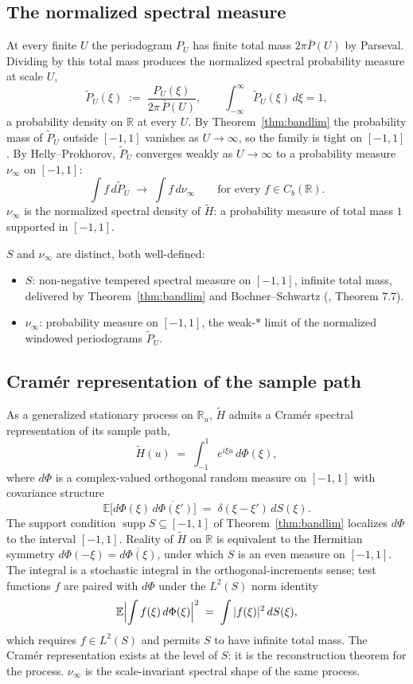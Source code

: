 \documentclass[11pt]{article}
\DeclareMathOperator{\supp}{supp}
\begin{document}
\subsection{The normalized spectral measure}\label{app:normalized}

At every finite $U$ the periodogram $P_U$ has finite total mass $2\pi\bar P(U)$ by Parseval. Dividing by this total mass produces the normalized spectral probability measure at scale $U$,
\[
\widetilde P_U(\xi) \;:=\; \frac{P_U(\xi)}{2\pi\,\bar P(U)},\qquad \int_{-\infty}^{\infty}\widetilde P_U(\xi)\,d\xi = 1,
\]
a probability density on $\mathbb{R}$ at every $U$. By Theorem~\ref{thm:bandlim} the probability mass of $\widetilde P_U$ outside $[-1,1]$ vanishes as $U\to\infty$, so the family is tight on $[-1,1]$. By Helly--Prokhorov, $\widetilde P_U$ converges weakly as $U\to\infty$ to a probability measure $\nu_\infty$ on $[-1,1]$:
\[
\int f\,d\widetilde P_U \;\longrightarrow\; \int f\,d\nu_\infty\qquad \text{for every } f\in C_b(\mathbb{R}).
\]
$\nu_\infty$ is the normalized spectral density of $\tilde H$: a probability measure of total mass $1$ supported in $[-1,1]$.

$S$ and $\nu_\infty$ are distinct, both well-defined:
\begin{itemize}[leftmargin=*]
\item $S$: non-negative tempered spectral measure on $[-1,1]$, infinite total mass, delivered by Theorem~\ref{thm:bandlim} and Bochner--Schwartz (\cite{Rudin-FA}, Theorem 7.7).
\item $\nu_\infty$: probability measure on $[-1,1]$, the weak-$*$ limit of the normalized windowed periodograms $\widetilde P_U$.
\end{itemize}

\subsection{Cram\'er representation of the sample path}\label{app:cramer}

As a generalized stationary process on $\mathbb{R}_u$, $\tilde H$ admits a Cram\'er spectral representation of its sample path,
\[
\tilde H(u) \;=\; \int_{-1}^{1} e^{i\xi u}\,d\Phi(\xi),
\]
where $d\Phi$ is a complex-valued orthogonal random measure on $[-1,1]$ with covariance structure
\[
\mathbb{E}\bigl[d\Phi(\xi)\,\overline{d\Phi(\xi')}\bigr] \;=\; \delta(\xi-\xi')\,dS(\xi).
\]
The support condition $\supp S\subseteq[-1,1]$ of Theorem~\ref{thm:bandlim} localizes $d\Phi$ to the interval $[-1,1]$. Reality of $\tilde H$ on $\mathbb{R}$ is equivalent to the Hermitian symmetry $d\Phi(-\xi)=\overline{d\Phi(\xi)}$, under which $S$ is an even measure on $[-1,1]$. The integral is a stochastic integral in the orthogonal-increments sense; test functions $f$ are paired with $d\Phi$ under the $L^2(S)$ norm identity
\[
\mathbb{E}\Bigl|\int f(\xi)\,d\Phi(\xi)\Bigr|^2 \;=\; \int|f(\xi)|^2\,dS(\xi),
\]
which requires $f\in L^2(S)$ and permits $S$ to have infinite total mass. The Cram\'er representation exists at the level of $S$: it is the reconstruction theorem for the process. $\nu_\infty$ is the scale-invariant spectral shape of the same process.
\end{document}
